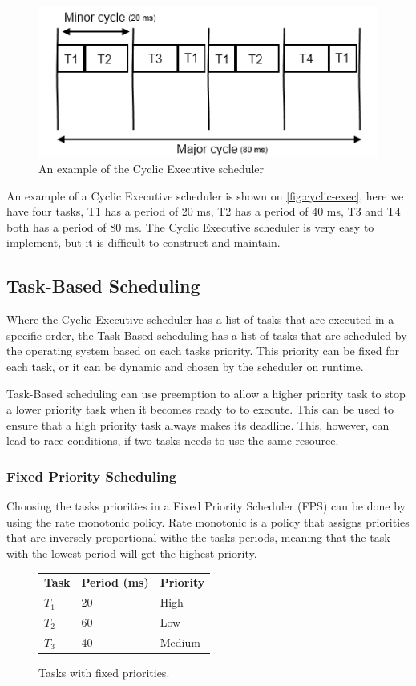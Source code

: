 \begin{figure}[hbtp]
\center
\includegraphics[width=.7\textwidth]{img/cyclic-exec.png}
\caption{An example of the Cyclic Executive scheduler} 
\label{fig:cyclic-exec} 
\end{figure}

An example of a Cyclic Executive scheduler is shown on \autoref{fig:cyclic-exec}, here we have four tasks, T1 has a period of 20 ms, T2 has a period of 40 ms, T3 and T4 both has a period of 80 ms.
The Cyclic Executive scheduler is very easy to implement, but it is difficult to construct and maintain.

\subsection{Task-Based Scheduling}
Where the Cyclic Executive scheduler has a list of tasks that are executed in a specific order, the Task-Based scheduling has a list of tasks that are scheduled by the operating system based on each tasks priority. This priority can be fixed for each task, or it can be dynamic and chosen by the scheduler on runtime.

Task-Based scheduling can use preemption to allow a higher priority task to stop a lower priority task when it becomes ready to to execute. This can be used to ensure that a high priority task always makes its deadline. This, however, can lead to race conditions, if two tasks needs to use the same resource.

\subsubsection{Fixed Priority Scheduling}
Choosing the tasks priorities in a Fixed Priority Scheduler (FPS) can be done by using the rate monotonic policy. Rate monotonic is a policy that assigns priorities that are inversely proportional withe the tasks periods, meaning that the task with the lowest period will get the highest priority.

\begin{figure}
\center
\begin{tabular}{ l | l | l }
    \hline                        
    \textbf{Task} & \textbf{Period (ms)} & \textbf{Priority}  \\
    $T_1$ & 20 & High \\
    $T_2$ & 60 & Low \\
    $T_3$ & 40 & Medium \\
    \hline  
\end{tabular}
\caption{Tasks with fixed priorities.}
\label{fig:fps}
\end{figure}

